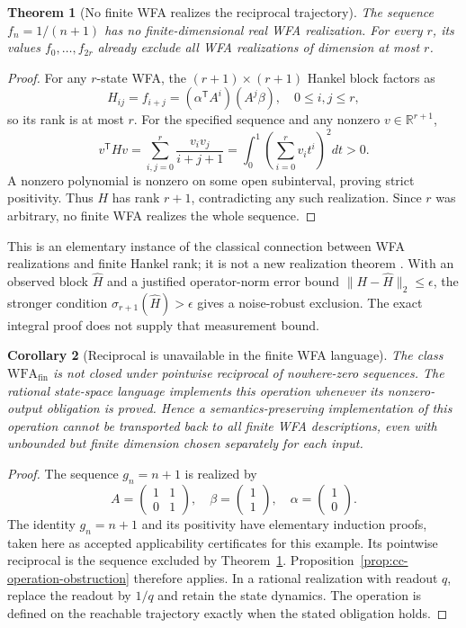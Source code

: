 \documentclass[11pt]{article}
\newtheorem{theorem}{Theorem}[section]
\newtheorem{corollary}[theorem]{Corollary}
\theoremstyle{definition}
\begin{document}
\begin{theorem}[No finite WFA realizes the reciprocal trajectory]
\label{thm:cc-hilbert}
The sequence $f_n=1/(n+1)$ has no finite-dimensional real WFA realization.
For every $r$, its values $f_0,\ldots,f_{2r}$ already exclude all WFA
realizations of dimension at most $r$.
\end{theorem}
\begin{proof}
For any $r$-state WFA, the $(r+1)\times(r+1)$ Hankel block factors as
\[
 H_{ij}=f_{i+j}
  =(\alpha^{\mathsf T}A^i)(A^j\beta),\quad 0\le i,j\le r,
\]
so its rank is at most $r$. For the specified sequence and any nonzero
$v\in\mathbb R^{r+1}$,
\[
 v^{\mathsf T}Hv
 =\sum_{i,j=0}^r\frac{v_iv_j}{i+j+1}
 =\int_0^1\left(\sum_{i=0}^r v_i t^i\right)^2dt>0.
\]
A nonzero polynomial is nonzero on some open subinterval, proving strict
positivity. Thus $H$ has rank $r+1$, contradicting any such realization.
Since $r$ was arbitrary, no finite WFA realizes the whole sequence.
\end{proof}

This is an elementary instance of the classical connection between WFA
realizations and finite Hankel rank; it is not a new realization theorem
\cite{cc-balle-mohri}. With an observed block $\widehat H$ and a justified
operator-norm error bound $\|H-\widehat H\|_2\le\epsilon$, the stronger
condition $\sigma_{r+1}(\widehat H)>\epsilon$ gives a noise-robust exclusion.
The exact integral proof does not supply that measurement bound.

\begin{corollary}[Reciprocal is unavailable in the finite WFA language]
\label{cor:cc-reciprocal}
The class $\mathrm{WFA}_{\mathrm{fin}}$ is not closed under pointwise
reciprocal of nowhere-zero sequences. The rational state-space language
implements this operation whenever its nonzero-output obligation is proved.
Hence a semantics-preserving implementation of this operation cannot be
transported back to all finite WFA descriptions, even with unbounded but
finite dimension chosen separately for each input.
\end{corollary}
\begin{proof}
The sequence $g_n=n+1$ is realized by
\[
 A=\begin{pmatrix}1&1\\0&1\end{pmatrix},\quad
 \beta=\begin{pmatrix}1\\1\end{pmatrix},\quad
 \alpha=\begin{pmatrix}1\\0\end{pmatrix}.
\]
The identity $g_n=n+1$ and its positivity have elementary induction proofs,
taken here as accepted applicability certificates for this example.
Its pointwise reciprocal is the sequence excluded by
Theorem~\ref{thm:cc-hilbert}. Proposition~\ref{prop:cc-operation-obstruction}
therefore applies. In a rational realization with readout $q$, replace the
readout by $1/q$ and retain the state dynamics. The operation is defined
on the reachable trajectory exactly when the stated obligation holds.
\end{proof}
\end{document}
